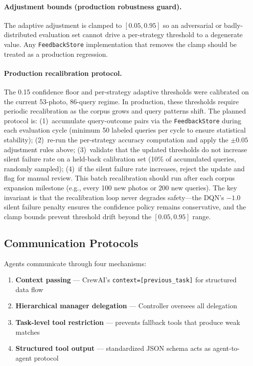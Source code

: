 \documentclass[11pt,letterpaper]{article}
\begin{document}
\paragraph{Adjustment bounds (production robustness guard).} The adaptive adjustment is clamped to $[0.05, 0.95]$ so an adversarial or badly-distributed evaluation set cannot drive a per-strategy threshold to a degenerate value. Any \texttt{FeedbackStore} implementation that removes the clamp should be treated as a production regression.

\paragraph{Production recalibration protocol.} The 0.15 confidence floor and per-strategy adaptive thresholds were calibrated on the current 53-photo, 86-query regime. In production, these thresholds require periodic recalibration as the corpus grows and query patterns shift. The planned protocol is: (1)~accumulate query-outcome pairs via the \texttt{FeedbackStore} during each evaluation cycle (minimum 50 labeled queries per cycle to ensure statistical stability); (2)~re-run the per-strategy accuracy computation and apply the $\pm0.05$ adjustment rules above; (3)~validate that the updated thresholds do not increase silent failure rate on a held-back calibration set (10\% of accumulated queries, randomly sampled); (4)~if the silent failure rate increases, reject the update and flag for manual review. This batch recalibration should run after each corpus expansion milestone (e.g., every 100 new photos or 200 new queries). The key invariant is that the recalibration loop never degrades safety---the DQN's $-1.0$ silent failure penalty ensures the confidence policy remains conservative, and the clamp bounds prevent threshold drift beyond the $[0.05, 0.95]$ range.

\subsection{Communication Protocols}

Agents communicate through four mechanisms:
\begin{enumerate}[nosep]
  \item \textbf{Context passing} --- CrewAI's \texttt{context=[previous\_task]} for structured data flow
  \item \textbf{Hierarchical manager delegation} --- Controller oversees all delegation
  \item \textbf{Task-level tool restriction} --- prevents fallback tools that produce weak matches
  \item \textbf{Structured tool output} --- standardized JSON schema acts as agent-to-agent protocol
\end{enumerate}
\end{document}
